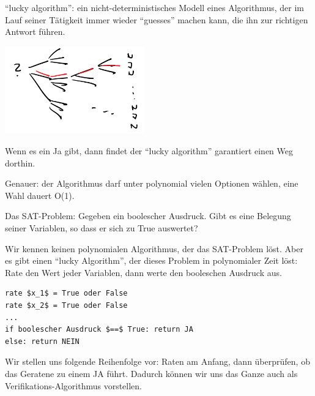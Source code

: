 \documentclass{beamer}
\begin{document}
\begin{frame}[fragile]
``lucky algorithm'': ein nicht-deterministisches Modell eines Algorithmus, der im Lauf seiner Tätigkeit immer wieder ``guesses'' machen kann, die ihn zur richtigen Antwort führen.

\pause 
\begin{minipage}[c]{6cm}
\includegraphics[width=6cm]{bild2.png}
\end{minipage} 
\begin{minipage}[c]{5cm}
Wenn es ein Ja gibt, dann findet der ``lucky algorithm'' garantiert einen Weg dorthin.
\end{minipage} 

 
Genauer: der Algorithmus darf unter polynomial vielen Optionen wählen, eine Wahl dauert O(1).
\end{frame}



\begin{frame}[fragile]
Das SAT-Problem: Gegeben ein boolescher Ausdruck. Gibt es eine Belegung seiner Variablen, so dass er sich 
zu True auswertet? \pause

Wir kennen keinen polynomialen Algorithmus, der das SAT-Problem löst. Aber es gibt einen ``lucky Algorithm'', der dieses Problem in polynomialer Zeit löst: Rate den Wert jeder Variablen, dann werte den booleschen Ausdruck aus.
\begin{lstlisting} 
rate $x_1$ = True oder False
rate $x_2$ = True oder False
...
if boolescher Ausdruck $==$ True: return JA
else: return NEIN
\end{lstlisting}  \pause

Wir stellen uns folgende Reihenfolge vor: Raten am Anfang, dann überprüfen, ob
das Geratene zu einem JA führt. Dadurch können wir uns das Ganze auch als Verifikations-Algorithmus vorstellen.
\end{frame}
\end{document}
